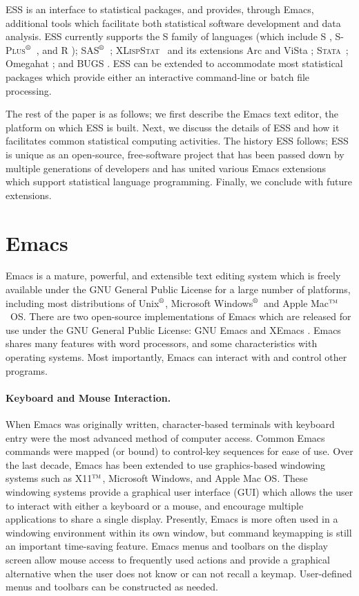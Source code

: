 \documentclass{article}
\newcommand*{\regstrd}{$^{\mbox{\scriptsize{\textregistered}}}$}
\newcommand*{\tm}{$^{\mbox{\scriptsize\sc tm}}$}
\newcommand*{\SAS}{\textsc{SAS}}
\newcommand*{\Splus}{\textsc{S-Plus}}
\newcommand*{\XLispStat}{\textsc{XLispStat}}
\newcommand*{\Stata}{\textsc{Stata}}
\begin{document}
ESS is an interface to statistical packages, and provides,
through Emacs, additional tools which facilitate both statistical
software development and data analysis.  ESS currently supports
the S family of languages (which include
S \citep{BecRCW88,ChaJH92,ChaJ98}, \Splus\regstrd\ \citep{Splus}, and R
\citep{ihak:gent:1996}); \SAS\regstrd\ \citep{SAS:8}; \XLispStat\
\citep{Tier90} and its extensions Arc \citep{Cook:Weisberg:1999} and
ViSta \citep{youn:fald:mcfa:1992}; \Stata\ \citep{Stata:6.0}; Omegahat
\citep{DTLang:2000}; and BUGS \citep{BUGS}.  ESS can be
extended to accommodate most statistical packages which provide either
an interactive command-line or batch file processing.

The rest of the paper is as follows; we first describe the Emacs text
editor, the platform on which ESS is built.  Next, we discuss the
details of ESS and how it facilitates common statistical computing
activities.  The history ESS follows; ESS is unique as an open-source,
free-software project that has been passed down by multiple
generations of developers and has united various Emacs extensions
which support statistical language programming.  Finally, we conclude
with future extensions.

\section{Emacs}
\label{sec:emacs}

Emacs is a mature, powerful, and extensible text editing system which
is freely available under the GNU General Public License for a large
number of platforms, including most distributions of Unix\regstrd, Microsoft
Windows\regstrd\ and Apple Mac\tm\ OS.  There are two open-source
implementations of Emacs which are released for use under the GNU
General Public License: GNU Emacs \citep{GNU-Emacs} and XEmacs
\citep{XEmacs}.  Emacs shares many features with word processors, and
some characteristics with operating systems.  Most importantly, Emacs
can interact with and control other programs.

\paragraph{Keyboard and Mouse Interaction.}
When Emacs was originally written, character-based terminals with
keyboard entry were the most advanced method of computer access.
Common Emacs commands were mapped (or bound) to control-key sequences
for ease of use.  Over the last decade, Emacs has been extended to use
graphics-based windowing systems such as X11\tm, Microsoft Windows,
and Apple Mac OS.  These windowing systems provide a graphical user
interface (GUI) which allows the user to interact with either a
keyboard or a mouse, and encourage multiple applications to share a
single display.  Presently, Emacs is more often used in a windowing
environment within its own window, but command keymapping is still an
important time-saving feature.  Emacs menus and toolbars on the
display screen allow mouse access to frequently used actions and
provide a graphical alternative when the user does not know or can not
recall a keymap.  User-defined menus and toolbars can be constructed
as needed.
\end{document}
